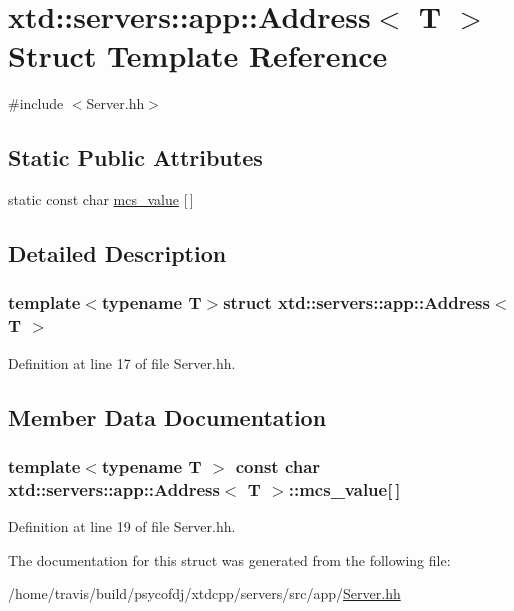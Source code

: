 \hypertarget{structxtd_1_1servers_1_1app_1_1Address}{\section{xtd\-:\-:servers\-:\-:app\-:\-:Address$<$ T $>$ Struct Template Reference}
\label{structxtd_1_1servers_1_1app_1_1Address}
}


{\ttfamily \#include $<$Server.\-hh$>$}

\subsection*{Static Public Attributes}
\begin{DoxyCompactItemize}
\item 
static const char \hyperlink{structxtd_1_1servers_1_1app_1_1Address_a1768226cda5b8487c875fae8dc279ccf}{mcs\-\_\-value} \mbox{[}$\,$\mbox{]}
\end{DoxyCompactItemize}


\subsection{Detailed Description}
\subsubsection*{template$<$typename T$>$struct xtd\-::servers\-::app\-::\-Address$<$ T $>$}



Definition at line 17 of file Server.\-hh.



\subsection{Member Data Documentation}
\hypertarget{structxtd_1_1servers_1_1app_1_1Address_a1768226cda5b8487c875fae8dc279ccf}{
\subsubsection[{mcs\-\_\-value}]{\setlength{\rightskip}{0pt plus 5cm}template$<$typename T $>$ const char {\bf xtd\-::servers\-::app\-::\-Address}$<$ T $>$\-::mcs\-\_\-value\mbox{[}$\,$\mbox{]}\hspace{0.3cm}{\ttfamily [static]}}}\label{structxtd_1_1servers_1_1app_1_1Address_a1768226cda5b8487c875fae8dc279ccf}


Definition at line 19 of file Server.\-hh.



The documentation for this struct was generated from the following file\-:\begin{DoxyCompactItemize}
\item 
/home/travis/build/psycofdj/xtdcpp/servers/src/app/\hyperlink{Server_8hh}{Server.\-hh}\end{DoxyCompactItemize}
